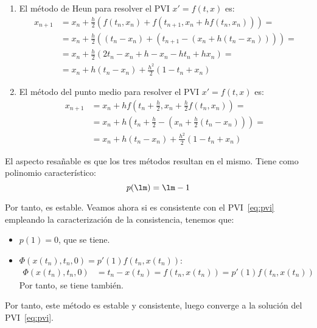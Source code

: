 \begin{ejercicio}
\begin{enumerate}
        \item El método de Heun para resolver el PVI $x' = f(t, x)$ es:
        \begin{align*}
            x_{n+1} &= x_n + \frac{h}{2} \left( f(t_n, x_n) + f(t_{n+1}, x_{n} + h f(t_n, x_n)) \right)
            =\\&= x_n + \frac{h}{2} \left( (t_n - x_n) + (t_{n+1} - (x_n + h(t_n - x_n))) \right)
            =\\&= x_n + \frac{h}{2} \left( 2t_n -x_n +h -x_n -ht_n +hx_n\right)
            =\\&= x_n + h(t_n - x_n) + \frac{h^2}{2} \left( 1 - t_n + x_n \right)
        \end{align*}

        \item El método del punto medio para resolver el PVI $x' = f(t, x)$ es:
        \begin{align*}
            x_{n+1} &= x_n + h f\left(t_n + \frac{h}{2}, x_n + \frac{h}{2} f(t_n, x_n)\right)
            =\\&= x_n + h\left(t_n + \frac{h}{2} - (x_n + \frac{h}{2} (t_n - x_n))\right)
            =\\&= x_n + h(t_n - x_n) + \frac{h^2}{2} (1 - t_n + x_n)
        \end{align*}
    \end{enumerate}

    El aspecto resañable es que los tres métodos resultan en el mismo.
    Tiene como polinomio característico:
    \begin{equation*}
        p(\lm) = \lm - 1
    \end{equation*}

    Por tanto, es estable. Veamos ahora si es consistente con el PVI~\eqref{eq:pvi} empleando la caracterización de la consistencia, tenemos que:
    \begin{itemize}
        \item $p(1)= 0$, que se tiene.
        \item $\Phi(x(t_n), t_n, 0)=p'(1)f(t_n, x(t_n))$:
        \begin{align*}
            \Phi(x(t_n), t_n, 0) &= t_n - x(t_n) = f(t_n, x(t_n)) = p'(1) f(t_n, x(t_n))
        \end{align*}
        Por tanto, se tiene también.
    \end{itemize}

    Por tanto, este método es estable y consistente, luego converge a la solución del PVI~\eqref{eq:pvi}.
\end{ejercicio}

